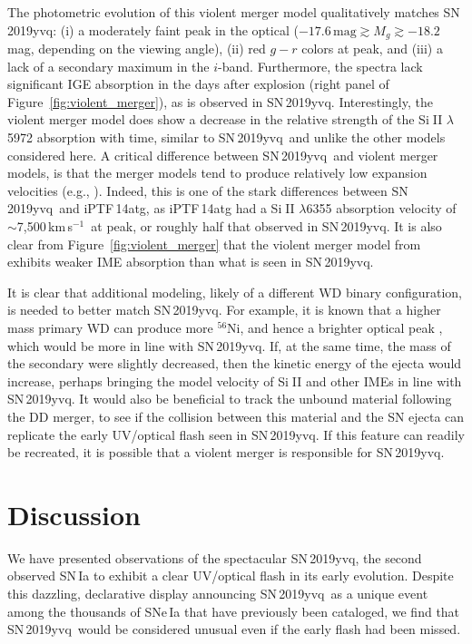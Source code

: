 \documentclass[twocolumn]{aastex63}
\def\ion#1#2{#1$\;${\footnotesize\rm{#2}}\relax}
\newcommand{\kms}{km\,s$^{-1}$}
\newcommand{\radni}{$^{56}$Ni}
\newcommand{\sn}{SN\,2019yvq}
\begin{document}
The photometric evolution of this violent merger model qualitatively matches
\sn: (i) a moderately faint peak in the optical ($-17.6\,\mathrm{mag} \gtrsim
M_g \gtrsim -18.2$\,mag, depending on the viewing angle), (ii) red $g - r$
colors at peak, and (iii) a lack of a secondary maximum in the $i$-band.
Furthermore, the spectra lack significant IGE absorption in the days after
explosion (right panel of Figure~\ref{fig:violent_merger}), as is observed in
\sn. Interestingly, the violent merger model does show a decrease in the
relative strength of the \ion{Si}{II} $\lambda$5972 absorption with time,
similar to \sn\ and unlike the other models considered here. A critical
difference between \sn\ and violent merger models, is that the merger models
tend to produce relatively low expansion velocities (e.g.,
\citealt{Pakmor10,Kromer13a,Kromer16}). Indeed, this is one of the stark
differences between \sn\ and iPTF\,14atg, as iPTF\,14atg had a \ion{Si}{II}
$\lambda$6355 absorption velocity of $\sim$7,500\,\kms\ at peak, or roughly
half that observed in \sn. It is also clear from
Figure~\ref{fig:violent_merger} that the violent merger model from
\citet{Kromer16} exhibits weaker IME absorption than what is seen in \sn.

It is clear that additional modeling, likely of a different WD binary
configuration, is needed to better match \sn. For example, it is known that a
higher mass primary WD can produce more \radni, and hence a brighter optical
peak \citep[e.g.,][]{Pakmor12}, which would be more in line with \sn. If, at
the same time, the mass of the secondary were slightly decreased, then the
kinetic energy of the ejecta would increase, perhaps bringing the model
velocity of \ion{Si}{II} and other IMEs in line with \sn. It would also be
beneficial to track the unbound material following the DD merger, to see if
the collision between this material and the SN ejecta can replicate the early
UV/optical flash seen in \sn. If this feature can readily be recreated, it is
possible that a violent merger is responsible for \sn.

\section{Discussion}\label{sec:conclusions}



We have presented observations of the spectacular \sn, the second observed
SN\,Ia to exhibit a clear UV/optical flash in its early evolution. Despite
this dazzling, declarative display announcing \sn\ as a unique event among the
thousands of SNe\,Ia that have previously been cataloged, we find that \sn\
would be considered unusual even if the early flash had been missed.
\end{document}
